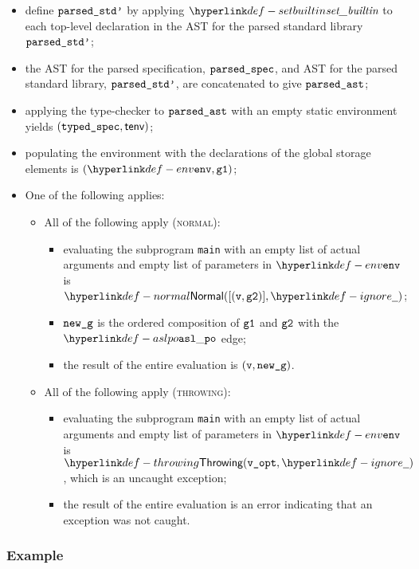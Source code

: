   \begin{itemize}
    \item define $\texttt{parsed\_std'}$ by applying $\setbuiltin$ to each top-level declaration in the AST for the parsed standard library $\texttt{parsed\_std'}$\ProseOrTypeError;
    \item the AST for the parsed specification, $\texttt{parsed\_spec}$, and AST for the parsed standard library,
    $\texttt{parsed\_std'}$, are concatenated to give $\texttt{parsed\_ast}$;
    \item applying the type-checker to $\texttt{parsed\_ast}$ with an empty static environment yields
    $(\texttt{typed\_spec}, \textsf{tenv})$;
    \item populating the environment with the declarations of the global storage elements
    is $(\env, \vgone)$\ProseOrError;
    \item One of the following applies:
    \begin{itemize}
      \item All of the following apply (\textsc{normal}):
      \begin{itemize}
        \item evaluating the subprogram \texttt{main} with an empty list of actual arguments and empty list of parameters
        in $\env$ is $\Normal([(\vv, \vgtwo)], \Ignore)$\ProseOrError;
        \item $\texttt{new\_g}$ is the ordered composition of $\texttt{g1}$ and $\texttt{g2}$ with the $\aslpo$ edge;
        \item the result of the entire evaluation is $(\texttt{v}, \texttt{new\_g})$.
      \end{itemize}

      \item All of the following apply (\textsc{throwing}):
      \begin{itemize}
        \item evaluating the subprogram \texttt{main} with an empty list of actual arguments and empty list of parameters
        in $\env$ is $\Throwing(\texttt{v\_opt}, \Ignore)$, which is an uncaught exception;
        \item the result of the entire evaluation is an error indicating that an exception was not caught.
      \end{itemize}
    \end{itemize}
  \end{itemize}

  \subsubsection{Example}


